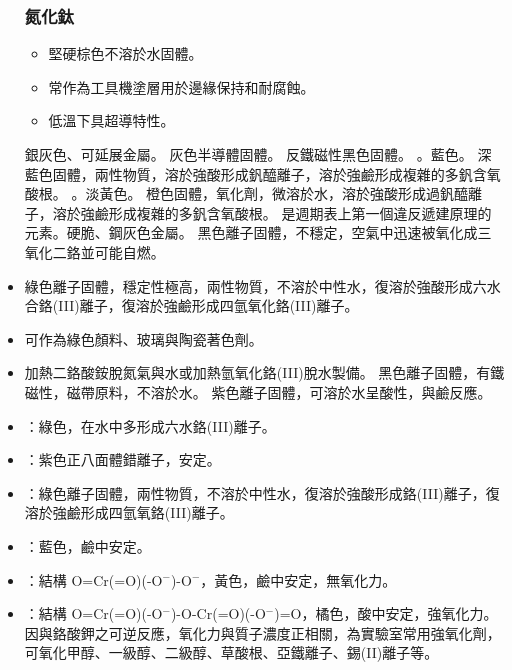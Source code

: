 \documentclass[a4paper,12pt]{report}
\begin{document}
\begin{itemize}
\subsubsection{氮化鈦}
\begin{itemize}
\item 堅硬棕色不溶於水固體。
\item 常作為工具機塗層用於邊緣保持和耐腐蝕。
\item 低溫下具超導特性。
\end{itemize}
銀灰色、可延展金屬。
灰色半導體固體。
反鐵磁性黑色固體。
。藍色。
深藍色固體，兩性物質，溶於強酸形成釩醯離子，溶於強鹼形成複雜的多釩含氧酸根。
。淡黃色。
橙色固體，氧化劑，微溶於水，溶於強酸形成過釩醯離子，溶於強鹼形成複雜的多釩含氧酸根。
是週期表上第一個違反遞建原理的元素。硬脆、鋼灰色金屬。
黑色離子固體，不穩定，空氣中迅速被氧化成三氧化二鉻並可能自燃。
\bit
\item 綠色離子固體，穩定性極高，兩性物質，不溶於中性水，復溶於強酸形成六水合鉻(III)離子，復溶於強鹼形成四氫氧化鉻(III)離子。
\item 可作為綠色顏料、玻璃與陶瓷著色劑。
\item 加熱二鉻酸銨脫氮氣與水或加熱氫氧化鉻(III)脫水製備。
\eit
{}
黑色離子固體，有鐵磁性，磁帶原料，不溶於水。
紫色離子固體，可溶於水呈酸性，與鹼反應。
\bit
\item {}：綠色，在水中多形成六水鉻(III)離子。
\item {}：紫色正八面體錯離子，安定。
\item {}：綠色離子固體，兩性物質，不溶於中性水，復溶於強酸形成鉻(III)離子，復溶於強鹼形成四氫氧鉻(III)離子。
\item {}：藍色，鹼中安定。
\eit
{}
\bit
\item {}：結構 O=Cr(=O)(-O$^-$)-O$^-$，黃色，鹼中安定，無氧化力。
\item {}：結構 O=Cr(=O)(-O$^-$)-O-Cr(=O)(-O$^-$)=O，橘色，酸中安定，強氧化力。因與鉻酸鉀之可逆反應，氧化力與質子濃度正相關，為實驗室常用強氧化劑，可氧化甲醇、一級醇、二級醇、草酸根、亞鐵離子、錫(II)離子等。

\end{itemize}
\end{document}
